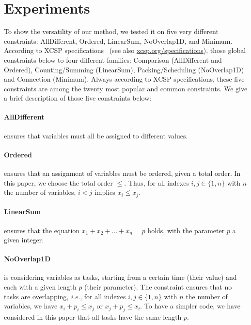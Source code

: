 \documentclass{article}
\newcommand{\ie}{\textit{i.e.}}
\begin{document}
\section{Experiments}\label{sec:xp}
To show the versatility of our method, we tested it on five very different constraints:  AllDifferent, Ordered,  LinearSum, NoOverlap1D, and Minimum.   According to XCSP specifications~\cite{xcsp}  (see also \href{http://xcsp.org/specifications}{xcsp.org/specifications}), those global  constraints   below  to  four different   families:  Comparison (AllDifferent    and     Ordered),    Counting/Summing    (LinearSum), Packing/Scheduling  (NoOverlap1D)  and Connection  (Minimum).   Always according to XCSP specifications, these five constraints are among the twenty most popular and common constraints.  We give a  brief description of those five constraints below:

\paragraph{AllDifferent} ensures that variables must all be assigned to different values.

\paragraph{Ordered} ensures  that an  assignment of variables  must be ordered, given a total order. In this paper, we choose the total order $\leq$. Thus, for all indexes $i,j \in \{1,n\}$ with $n$ the number of variables, $i < j$ implies $x_i \leq x_j$.

\paragraph{LinearSum}       ensures       that      the       equation $x_1 + x_2 +  \ldots + x_n = p$ holds, with the  parameter $p$ a given integer.

\paragraph{NoOverlap1D}  is considering  variables as  tasks, starting from a  certain time (their  value) and each  with a given  length $p$ (their  parameter).    The  constraint  ensures  that   no  tasks  are overlapping,  \ie, for  all indexes  $i,j  \in \{1,n\}$  with $n$  the number   of   variables,  we   have   $x_i   +   p_i  \leq   x_j$   or $x_j + p_j \leq  x_i$.  To have a simpler code,  we have considered in this paper that all tasks have the same length $p$.
\end{document}
